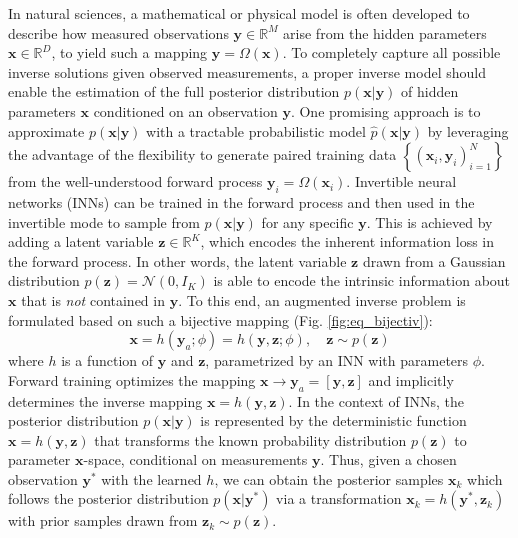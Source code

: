 \documentclass[letterpaper]{article} %
\begin{document}
In natural sciences, a mathematical or physical model is often developed to describe how measured observations $\mathbf{y} \in \mathbb{R}^{M}$ arise from the hidden parameters $\mathbf{x} \in \mathbb{R}^D$, to yield such a mapping $\mathbf{y}=\Omega(\mathbf{x})$. To completely capture all possible inverse solutions given observed measurements, a proper inverse model should enable the estimation of the full posterior distribution $p(\mathbf{x}|\mathbf{y})$ of hidden parameters $\mathbf{x}$ conditioned on an observation $\mathbf{y}$. One promising approach is to approximate $p(\mathbf{x}|\mathbf{y})$ with a tractable probabilistic model $\hat{p}(\mathbf{x}|\mathbf{y})$ by leveraging the advantage of the flexibility to generate paired training data $\left\{(\mathbf{x}_i, \mathbf{y}_i)_{i=1}^N \right\}$ from the well-understood forward process $\mathbf{y}_i = \Omega(\mathbf{x}_i)$. Invertible neural networks (INNs) \citep{ rezende2015variational,dinh2016density,ardizzone2018analyzing} can be trained in the forward process and then used in the invertible mode to sample from $p(\mathbf{x}|\mathbf{y})$ for any specific $\mathbf{y}$. This is achieved by adding a latent variable $\mathbf{z} \in \mathbb{R}^K$, which encodes the inherent information loss in the forward process. In other words, the latent variable $\mathbf{z}$ drawn from a Gaussian distribution $p(\mathbf{z}) = \mathcal{N}(0,I_K)$ is able to encode the intrinsic information about $\mathbf{x}$ that is {\em not} contained in $\mathbf{y}$. To this end, an augmented inverse problem is formulated based on such a bijective mapping (Fig. \ref{fig:eq_bijectiv}):
\begin{equation}
    \mathbf{x} = h(\mathbf{y}_a; \phi) = h(\mathbf{y},\mathbf{z}; \phi), \quad \mathbf{z} \sim p(\mathbf{z}) \label{eq:bijective}
\end{equation}
where $h$ is a function of $\mathbf{y}$ and $\mathbf{z}$, parametrized by an INN with parameters $\phi$. Forward training optimizes the mapping $\mathbf{x} \rightarrow \mathbf{y}_a = [\mathbf{y}, \mathbf{z}]$ and implicitly determines the inverse mapping $\mathbf{x} = h(\mathbf{y},\mathbf{z})$. In the context of INNs, the posterior distribution $p(\mathbf{x}|\mathbf{y})$ is represented by the deterministic function $\mathbf{x}=h(\mathbf{y},\mathbf{z})$ that transforms the known probability distribution $p(\mathbf{z})$ to parameter $\mathbf{x}$-space, conditional on measurements $\mathbf{y}$. Thus, given a chosen observation $\mathbf{y}^*$ with the learned $h$, we can obtain the posterior samples $\mathbf{x}_k$ which follows the posterior distribution $p(\mathbf{x} | \mathbf{y}^*)$ via a transformation $\mathbf{x}_k = h(\mathbf{y}^*,\mathbf{z}_k)$ with prior samples drawn from $\mathbf{z}_k \sim p(\mathbf{z})$.
\end{document}
